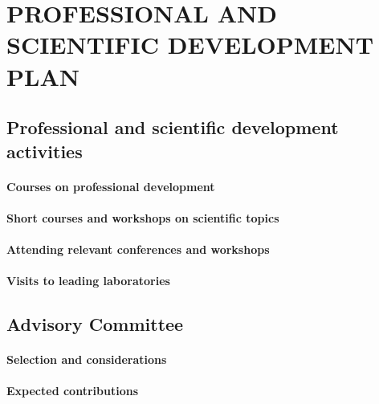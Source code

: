 \documentclass[11pt,letterpaper]{article}
\begin{document}
\section{PROFESSIONAL AND SCIENTIFIC DEVELOPMENT PLAN}


\subsection{Professional and scientific development activities}

\paragraph{Courses on professional development}

\paragraph{Short courses and workshops on scientific topics}

\paragraph{Attending relevant conferences and workshops}

\paragraph{Visits to leading laboratories}

\subsection{Advisory Committee}

\paragraph{Selection and considerations}

\paragraph{Expected contributions}
\end{document}
